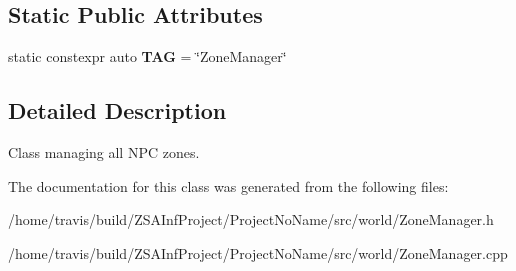 \subsection*{Static Public Attributes}
\begin{DoxyCompactItemize}
\item 
\hypertarget{classZoneManager_a43f89374f88d835f4e511d502ce3fca5}{static constexpr auto {\bfseries T\-A\-G} = \char`\"{}Zone\-Manager\char`\"{}}\label{classZoneManager_a43f89374f88d835f4e511d502ce3fca5}

\end{DoxyCompactItemize}


\subsection{Detailed Description}
Class managing all N\-P\-C zones. 

The documentation for this class was generated from the following files\-:\begin{DoxyCompactItemize}
\item 
/home/travis/build/\-Z\-S\-A\-Inf\-Project/\-Project\-No\-Name/src/world/Zone\-Manager.\-h\item 
/home/travis/build/\-Z\-S\-A\-Inf\-Project/\-Project\-No\-Name/src/world/Zone\-Manager.\-cpp\end{DoxyCompactItemize}
